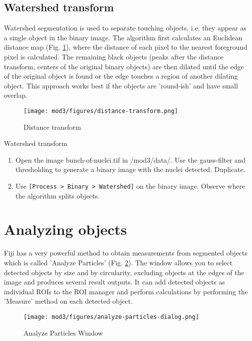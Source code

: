 \subsection{Watershed transform}
Watershed segmentation is used to separate touching objects, i.e. they appear as a single object in the binary image. The algorithm first calculates an Euclidean distance map (Fig. \ref{fig:distance-transform}), where the distance of each pixel to the nearest foreground pixel is calculated. The remaining black objects (peaks after the distance transform, centers of the original binary objects) are then dilated until the edge of the original object is found or the edge touches a region of another dilating object. This approach works best if the objects are 'round-ish' and have small overlap.

\begin{figure}[!ht]
	\centering
		\texttt{[image: mod3/figures/distance-transform.png]}
	\caption{Distance transform}
	\label{fig:distance-transform}
\end{figure}

\newpage
\begin{taskbox}{Watershed transform}
\begin{enumerate}
	\item Open the image bunch-of-nuclei.tif in /mod3/data/. Use the gauss-filter and thresholding to generate a binary image with the nuclei detected. Duplicate. 
	\item Use \texttt{[Process > Binary > Watershed]} on the binary image. Observe where the algorithm splits objects.
	\end{enumerate}
\end{taskbox}

\section{Analyzing objects}

Fiji has a very powerful method to obtain measurements from segmented objects which is called 'Analyze Particles' (Fig. \ref{fig:analyze-particles-dialog}). The window allows you to select detected objects by size and by circularity, excluding objects at the edges of the image and produces several result outputs. It can add detected objects as individual ROIs to the ROI manager and perform calculations by performing the 'Measure' method on each detected object.

\begin{figure}[!ht]
	\centering
		\texttt{[image: mod3/figures/analyze-particles-dialog.png]}
	\caption{Analyze Particles Window}
	\label{fig:analyze-particles-dialog}
\end{figure}


